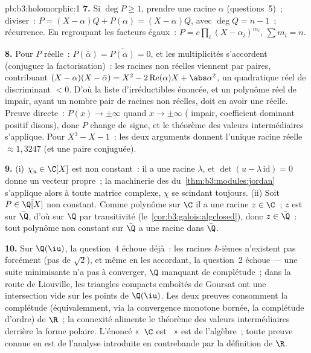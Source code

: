 \begin{solution}{pb:b3:holomorphic:1}
\textbf{7.} Si $\deg P \geq 1$, prendre une racine $\alpha$
(questions~5)~; diviser~: $P = (X - \alpha)Q + P(\alpha) =
(X - \alpha)Q$, avec $\deg Q = n - 1$~; récurrence. En
regroupant les facteurs égaux~: $P = c\prod_i(X -
\alpha_i)^{m_i}$, $\sum m_i = n$.

\textbf{8.} Pour $P$ réelle~: $P(\bar\alpha) =
\overline{P(\alpha)} = 0$, et les multiplicités s'accordent
(conjuguer la factorisation)~: les racines non réelles
viennent par paires, contribuant $(X - \alpha)(X -
\bar\alpha) = X^2 - 2\operatorname{Re}(\alpha)X +
\abs\alpha^2$, un quadratique réel de discriminant $< 0$.
D'où la liste d'irréductibles énoncée, et un polynôme réel
de  impair, ayant un nombre pair de racines non
réelles, doit en avoir une réelle. Preuve directe~: $P(x)
\to \pm\infty$ quand $x \to \pm\infty$ ( impair,
coefficient dominant positif disons), donc $P$ change de
signe, et le théorème des valeurs intermédiaires
s'applique. Pour $X^3 - X - 1$~: les deux arguments donnent
l'unique racine réelle $\approx 1{,}3247$ (et une paire
conjuguée).

\textbf{9.} (i) $\chi_u \in \C[X]$ est non constant~: il a
une racine $\lambda$, et $\det(u - \lambda\,\mathrm{id}) =
0$ donne un vecteur propre~; la machinerie des  du~\cref{thm:b3:modules:jordan} s'applique
alors à toute matrice complexe, $\chi$ se scindant
toujours. (ii) Soit $P \in \bar\Q[X]$ non constant. Comme
polynôme sur $\C$ il a une racine $z \in \C$~; $z$ est
 sur $\bar\Q$, d'où sur $\Q$ par transitivité
(le~\cref{cor:b3:galois:algclosed}), donc $z \in \bar\Q$~:
tout polynôme non constant sur $\bar\Q$ a une racine dans
$\bar\Q$.

\textbf{10.} Sur $\Q(\iu)$, la question~4 échoue déjà~: les
racines $k$-ièmes n'existent pas forcément (pas de
$\sqrt2$), et même en les accordant, la question~2 échoue
--- une suite minimisante n'a pas à converger, $\Q$ manquant
de complétude~; dans la route de Liouville, les triangles
compacts emboîtés de Goursat ont une intersection vide sur
les points de $\Q(\iu)$. Les deux preuves consomment la
complétude (équivalemment, via la convergence monotone
bornée, la complétude d'ordre) de $\R$~; la connexité
alimente le théorème des valeurs intermédiaires derrière la
forme polaire. L'énoncé «~$\C$ est ~»
est de l'algèbre~; toute preuve connue en est de l'analyse
introduite en contrebande par la définition de $\R$.


\end{solution}
